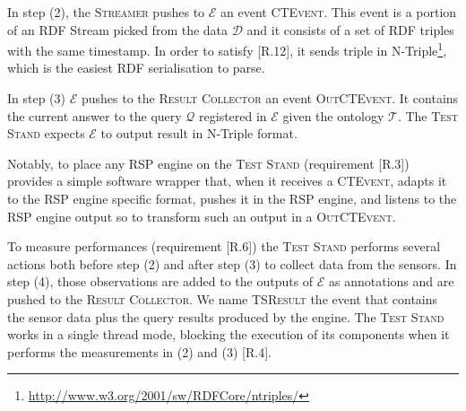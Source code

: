                                                                                                                                                                                                                                                                                                                                                                                                                                                                                                                                                                                                                                                                                                                                                                                                                                                                                                                                                                                                                                                                                                                                                                                                                                                                  

In step (2), the \textsc{Streamer} pushes to $\mathcal{E}$ an event \textsc{CTEvent}. This event is a portion of an RDF Stream picked from the data $\mathcal{D}$ and it consists of a set of RDF triples with the same timestamp. In order to satisfy [R.12], it sends triple in N-Triple\footnote{\url{http://www.w3.org/2001/sw/RDFCore/ntriples/}}, which is the easiest RDF serialisation to parse.  

In step (3) $\mathcal{E}$ pushes to the \textsc{Result Collector} an event \textsc{OutCTEvent}. It contains the current answer to the query $\mathcal{Q}$ registered in $\mathcal{E}$ given the ontology $\mathcal{T}$. The \textsc{Test Stand} expects $\mathcal{E}$ to output result in N-Triple format. 

Notably, to place any RSP engine on the \textsc{Test Stand} (requirement [R.3]) \name provides a simple software wrapper that, when it receives a \textsc{CTEvent}, adapts it to the RSP engine specific format, pushes it in the RSP engine, and listens to the RSP engine output so to transform such an output in a \textsc{OutCTEvent}.

To measure performances (requirement [R.6]) the \textsc{Test Stand} performs several actions both before step (2) and after step (3) to collect data from the sensors. In step (4), those observations are added to the outputs of $\mathcal{E}$ as annotations and are pushed to the \textsc{Result Collector}.  We name \textsc{TSResult} the event that contains the sensor data plus the query results produced by the engine.  The \textsc{Test Stand} works in a single thread mode, blocking the execution of its components when it performs the measurements in (2) and (3) [R.4].  

